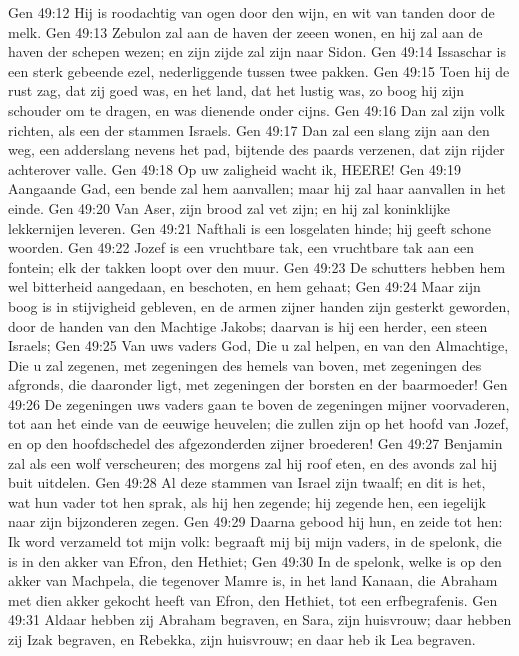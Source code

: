 Gen 49:12  Hij is roodachtig van ogen door den wijn, en wit van tanden door de melk.
Gen 49:13  Zebulon zal aan de haven der zeeen wonen, en hij zal aan de haven der schepen wezen; en zijn zijde zal zijn naar Sidon.
Gen 49:14  Issaschar is een sterk gebeende ezel, nederliggende tussen twee pakken.
Gen 49:15  Toen hij de rust zag, dat zij goed was, en het land, dat het lustig was, zo boog hij zijn schouder om te dragen, en was dienende onder cijns.
Gen 49:16  Dan zal zijn volk richten, als een der stammen Israels.
Gen 49:17  Dan zal een slang zijn aan den weg, een adderslang nevens het pad, bijtende des paards verzenen, dat zijn rijder achterover valle.
Gen 49:18  Op uw zaligheid wacht ik, HEERE!
Gen 49:19  Aangaande Gad, een bende zal hem aanvallen; maar hij zal haar aanvallen in het einde.
Gen 49:20  Van Aser, zijn brood zal vet zijn; en hij zal koninklijke lekkernijen leveren.
Gen 49:21  Nafthali is een losgelaten hinde; hij geeft schone woorden.
Gen 49:22  Jozef is een vruchtbare tak, een vruchtbare tak aan een fontein; elk der takken loopt over den muur.
Gen 49:23  De schutters hebben hem wel bitterheid aangedaan, en beschoten, en hem gehaat;
Gen 49:24  Maar zijn boog is in stijvigheid gebleven, en de armen zijner handen zijn gesterkt geworden, door de handen van den Machtige Jakobs; daarvan is hij een herder, een steen Israels;
Gen 49:25  Van uws vaders God, Die u zal helpen, en van den Almachtige, Die u zal zegenen, met zegeningen des hemels van boven, met zegeningen des afgronds, die daaronder ligt, met zegeningen der borsten en der baarmoeder!
Gen 49:26  De zegeningen uws vaders gaan te boven de zegeningen mijner voorvaderen, tot aan het einde van de eeuwige heuvelen; die zullen zijn op het hoofd van Jozef, en op den hoofdschedel des afgezonderden zijner broederen!
Gen 49:27  Benjamin zal als een wolf verscheuren; des morgens zal hij roof eten, en des avonds zal hij buit uitdelen.
Gen 49:28  Al deze stammen van Israel zijn twaalf; en dit is het, wat hun vader tot hen sprak, als hij hen zegende; hij zegende hen, een iegelijk naar zijn bijzonderen zegen.
Gen 49:29  Daarna gebood hij hun, en zeide tot hen: Ik word verzameld tot mijn volk: begraaft mij bij mijn vaders, in de spelonk, die is in den akker van Efron, den Hethiet;
Gen 49:30  In de spelonk, welke is op den akker van Machpela, die tegenover Mamre is, in het land Kanaan, die Abraham met dien akker gekocht heeft van Efron, den Hethiet, tot een erfbegrafenis.
Gen 49:31  Aldaar hebben zij Abraham begraven, en Sara, zijn huisvrouw; daar hebben zij Izak begraven, en Rebekka, zijn huisvrouw; en daar heb ik Lea begraven.
